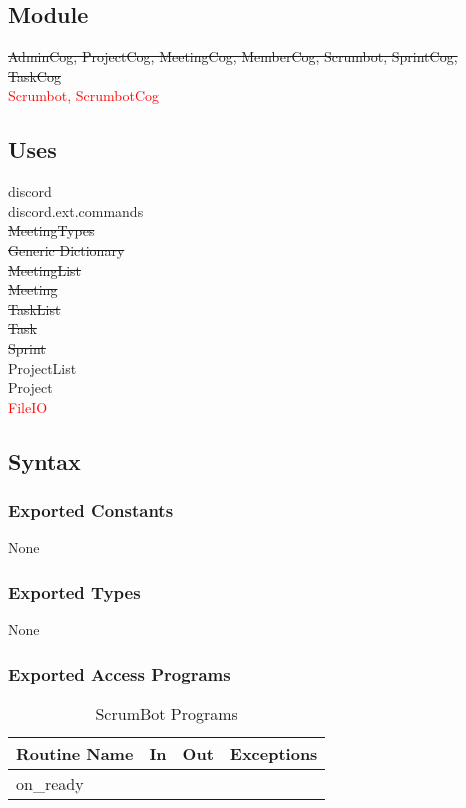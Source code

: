 \documentclass[12pt, titlepage]{article}
\begin{document}
\subsection*{Module}
\sout{AdminCog, ProjectCog, MeetingCog, MemberCog, Scrumbot, SprintCog, TaskCog}\\
\textcolor{red}{Scrumbot, ScrumbotCog}

\subsection* {Uses}
discord\\
discord.ext.commands\\
\sout{MeetingTypes\\
Generic Dictionary\\
MeetingList\\
Meeting\\
TaskList\\
Task\\
Sprint\\}
ProjectList\\
Project\\
\textcolor{red}{FileIO}

\subsection* {Syntax}
\subsubsection* {Exported Constants}
None

\subsubsection* {Exported Types}
None

\subsubsection* {Exported Access Programs}
\begin{table}[!htb]
    \centering
    \begin{tabular}{|p{3cm}|p{3cm}|p{3cm}|p{4.5cm}|}
        \hline
        \textbf{Routine Name} & \textbf{In} & \textbf{Out} & \textbf{Exceptions} \\
        \hline
        on\_ready & & & \\
        \hline
    \end{tabular}
    \caption{ScrumBot Programs}
    \label{tab:scrumbot}
\end{table}
\end{document}
